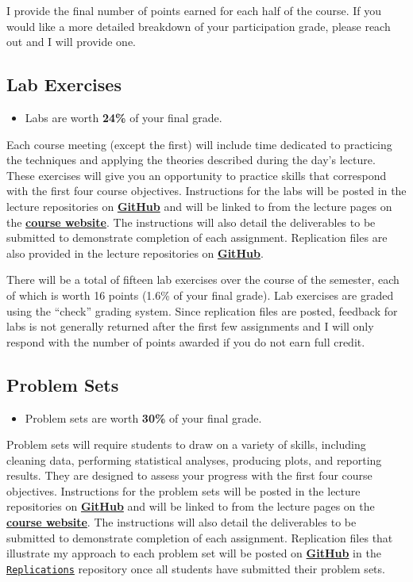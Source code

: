 \documentclass[]{book}
\newenvironment{rmdblock}[1]
  {\begin{shaded*}
  \begin{itemize}
  \renewcommand{\labelitemi}{
    \raisebox{-.7\height}[0pt][0pt]{
      {\setkeys{Gin}{width=3em,keepaspectratio}\texttt{[image: images/\#1]}}
    }
  }
  \item
  }
  {
  \end{itemize}
  \end{shaded*}
  }
\newenvironment{rmdtip}
  {\begin{rmdblock}{tip}}
  {\end{rmdblock}}
\begin{document}
I provide the final number of points earned for each half of the course. If you would like a more detailed breakdown of your participation grade, please reach out and I will provide one.

\hypertarget{lab-exercises}{%
\subsection{Lab Exercises}\label{lab-exercises}}

\begin{rmdtip}
Labs are worth \textbf{24\%} of your final grade.
\end{rmdtip}

Each course meeting (except the first) will include time dedicated to practicing the techniques and applying the theories described during the day's lecture. These exercises will give you an opportunity to practice skills that correspond with the first four course objectives. Instructions for the labs will be posted in the lecture repositories on \href{https://github.com/slu-soc5650}{\textbf{GitHub}} and will be linked to from the lecture pages on the \href{https://slu-soc5650.github.io/}{\textbf{course website}}. The instructions will also detail the deliverables to be submitted to demonstrate completion of each assignment. Replication files are also provided in the lecture repositories on \href{https://github.com/slu-soc5650}{\textbf{GitHub}}.

There will be a total of fifteen lab exercises over the course of the semester, each of which is worth 16 points (1.6\% of your final grade). Lab exercises are graded using the ``check'' grading system. Since replication files are posted, feedback for labs is not generally returned after the first few assignments and I will only respond with the number of points awarded if you do not earn full credit.

\hypertarget{problem-sets}{%
\subsection{Problem Sets}\label{problem-sets}}

\begin{rmdtip}
Problem sets are worth \textbf{30\%} of your final grade.
\end{rmdtip}

Problem sets will require students to draw on a variety of skills, including cleaning data, performing statistical analyses, producing plots, and reporting results. They are designed to assess your progress with the first four course objectives. Instructions for the problem sets will be posted in the lecture repositories on \href{https://github.com/slu-soc5650}{\textbf{GitHub}} and will be linked to from the lecture pages on the \href{https://slu-soc5650.github.io/}{\textbf{course website}}. The instructions will also detail the deliverables to be submitted to demonstrate completion of each assignment. Replication files that illustrate my approach to each problem set will be posted on \href{https://github.com/slu-soc5650}{\textbf{GitHub}} in the \href{https://github.com/slu-soc5650/Replications}{\texttt{Replications}} repository once all students have submitted their problem sets.
\end{document}

